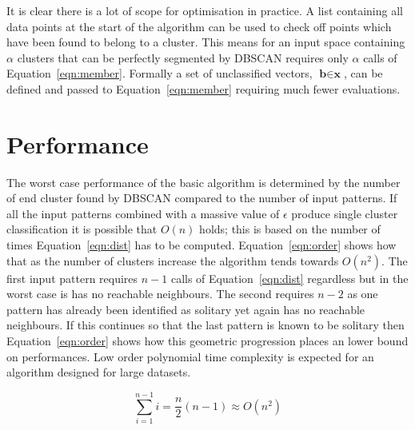 \documentclass{ecsarticle}     %
\begin{document}
It is clear there is a lot of scope for optimisation in practice.
A list containing all data points at the start of the algorithm can be used to check off points which have been found to belong to a cluster.
This means for an input space containing $\alpha$ clusters that can be perfectly segmented by DBSCAN requires only $\alpha$ calls of Equation~\eqref{eqn:member}.
Formally a set of unclassified vectors, $\textbf{b} \in \textbf{x} $, can be defined and passed to Equation~\eqref{eqn:member} requiring much fewer evaluations. 


\section{Performance}
\label{performance}

The worst case performance of the basic algorithm is determined by the number of end cluster found by DBSCAN compared to the number of input patterns.
If all the input patterns combined with a massive value of $\epsilon$ produce single cluster classification it is possible that $O(n)$ holds; this is based on the number of times Equation~\eqref{eqn:dist} has to be computed.
Equation~\eqref{eqn:order} shows how that as the number of clusters increase the algorithm tends towards $O(n^2)$.
The first input pattern requires $n-1$ calls of Equation~\eqref{eqn:dist} regardless but in the worst case is has no reachable neighbours.
The second requires $n-2$ as one pattern has already been identified as solitary yet again has no reachable neighbours.
If this continues so that the last pattern is known to be solitary then Equation~\eqref{eqn:order} shows how this geometric progression places an lower bound on performances.
Low order polynomial time complexity is expected for an algorithm designed for large datasets.

\begin{equation}
	\sum\limits_{i=1}^{n-1} i = \frac{n}{2}(n - 1) \approx O(n^2)	
	\label{eqn:order}
\end{equation}
\end{document}
